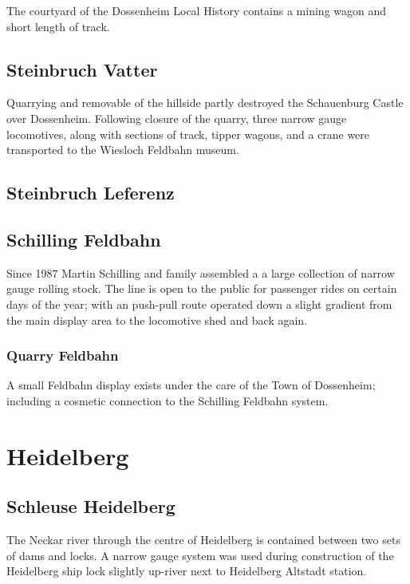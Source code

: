\documentclass[a4paper]{report}
\begin{document}
The courtyard of the Dossenheim Local History contains a mining wagon and short length of track.

\subsection{Steinbruch Vatter}

Quarrying and removable of the hillside partly destroyed the
Schauenburg Castle over Dossenheim.  Following closure of the quarry, three narrow
gauge locomotives, along with sections of track, tipper wagons, and a
crane were transported to the Wiesloch Feldbahn museum.

\subsection{Steinbruch Leferenz}

\subsection{Schilling Feldbahn}

Since 1987 Martin Schilling and family assembled a a large collection
of narrow gauge rolling stock.  The line is open to the public for
passenger rides on certain days of the year; with an push-pull route
operated down a slight gradient from the main display area to the
locomotive shed and back again.

\subsubsection{Quarry Feldbahn}

A small Feldbahn display exists under the care of the Town of
Dossenheim; including a cosmetic connection to the Schilling Feldbahn system.

\section{Heidelberg}

\subsection{Schleuse Heidelberg}

The Neckar river through the centre of Heidelberg is contained between
two sets of dams and locks.  A narrow gauge system was used during
construction of the Heidelberg ship lock slightly up-river next to
Heidelberg Altstadt station.
\end{document}
